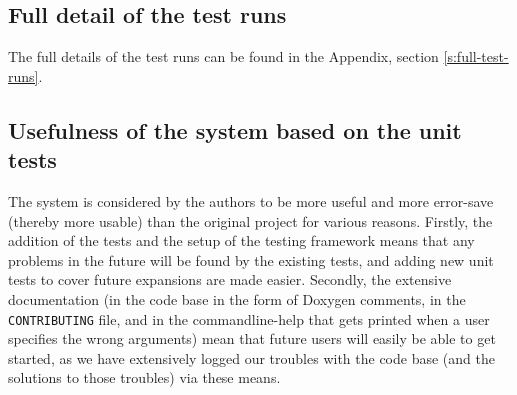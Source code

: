 \documentclass[11pt,a4paper]{article}
\begin{document}
\subsection{Full detail of the test runs}
The full details of the test runs can be found in the Appendix, section
\ref{s:full-test-runs}.


\subsection{Usefulness of the system based on the unit tests}
The system is considered by the authors to be more useful and more error-save
(thereby more usable) than the original project for various reasons. Firstly,
the addition of the tests and the setup of the testing framework means that any
problems in the future will be found by the existing tests, and adding new unit
tests to cover future expansions are made easier. Secondly, the extensive
documentation (in the code base in the form of Doxygen comments, in the
\texttt{CONTRIBUTING} file, and in the commandline-help that gets printed when
a user specifies the wrong arguments) mean that future users will easily be
able to get started, as we have extensively logged our troubles with the code
base (and the solutions to those troubles) via these means.
\end{document}
